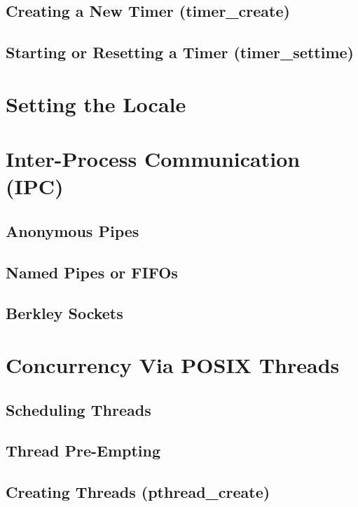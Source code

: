 \documentclass{article}
\begin{document}
\subsection{Creating a New Timer (timer\_create)}

\subsection{Starting or Resetting a Timer (timer\_settime)}

\section{Setting the Locale}

\section{Inter-Process Communication (IPC)}

\subsection{Anonymous Pipes}

\subsection{Named Pipes or FIFOs}

\subsection{Berkley Sockets}

\section{Concurrency Via POSIX Threads}

\subsection{Scheduling Threads}

\subsection{Thread Pre-Empting}

\subsection{Creating Threads (pthread\_create)}
\end{document}
